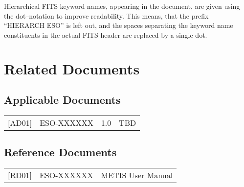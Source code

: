 Hierarchical FITS keyword names, appearing in the document, are given using the
dot--notation to improve readability. This means, that the prefix ``HIERARCH
ESO'' is left out, and the spaces separating the keyword name constituents in
the actual FITS header are replaced by a single dot.

\section{Related Documents}
\label{sec:doc-related}

\subsection{Applicable Documents}
\label{sec:doc-applicable}

\begin{tabularx}{\linewidth}{lllX}
  {[}AD01{]} & ESO-XXXXXX & 1.0
             & TBD \\
\end{tabularx}

\subsection{Reference Documents}
\label{sec:doc-reference}

\begin{tabularx}{\linewidth}{llX}
  {[}RD01{]} & ESO-XXXXXX
             & METIS User Manual \\
\end{tabularx}


